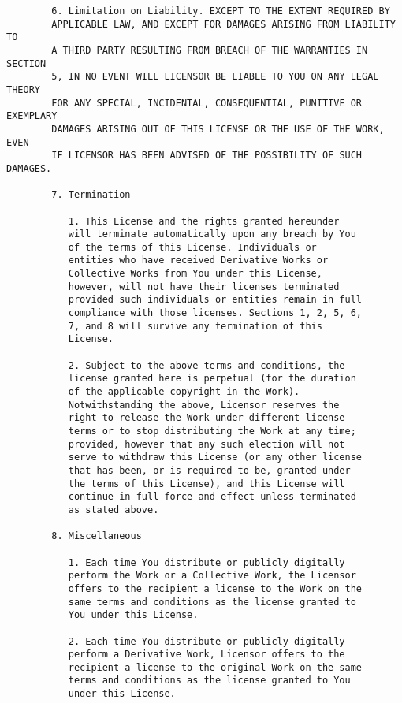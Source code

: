 \begin{verbatim}
        6. Limitation on Liability. EXCEPT TO THE EXTENT REQUIRED BY
        APPLICABLE LAW, AND EXCEPT FOR DAMAGES ARISING FROM LIABILITY TO
        A THIRD PARTY RESULTING FROM BREACH OF THE WARRANTIES IN SECTION
        5, IN NO EVENT WILL LICENSOR BE LIABLE TO YOU ON ANY LEGAL THEORY
        FOR ANY SPECIAL, INCIDENTAL, CONSEQUENTIAL, PUNITIVE OR EXEMPLARY
        DAMAGES ARISING OUT OF THIS LICENSE OR THE USE OF THE WORK, EVEN
        IF LICENSOR HAS BEEN ADVISED OF THE POSSIBILITY OF SUCH DAMAGES.
        
        7. Termination

           1. This License and the rights granted hereunder
           will terminate automatically upon any breach by You
           of the terms of this License. Individuals or
           entities who have received Derivative Works or
           Collective Works from You under this License,
           however, will not have their licenses terminated
           provided such individuals or entities remain in full
           compliance with those licenses. Sections 1, 2, 5, 6,
           7, and 8 will survive any termination of this
           License.
        
           2. Subject to the above terms and conditions, the
           license granted here is perpetual (for the duration
           of the applicable copyright in the Work).
           Notwithstanding the above, Licensor reserves the
           right to release the Work under different license
           terms or to stop distributing the Work at any time;
           provided, however that any such election will not
           serve to withdraw this License (or any other license
           that has been, or is required to be, granted under
           the terms of this License), and this License will
           continue in full force and effect unless terminated
           as stated above.

        8. Miscellaneous

           1. Each time You distribute or publicly digitally
           perform the Work or a Collective Work, the Licensor
           offers to the recipient a license to the Work on the
           same terms and conditions as the license granted to
           You under this License.
        
           2. Each time You distribute or publicly digitally
           perform a Derivative Work, Licensor offers to the
           recipient a license to the original Work on the same
           terms and conditions as the license granted to You
           under this License.
        

\end{verbatim}
